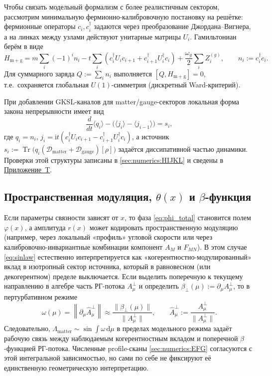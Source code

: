 \documentclass[11pt,a4paper]{article}
\DeclareMathOperator{\Tr}{Tr}
\newcommand{\ii}{\mathrm{i}}
\newcommand{\dd}{\mathrm{d}}
\theoremstyle{definition}
\theoremstyle{plain}
\theoremstyle{remark}
\begin{document}
Чтобы связать модельный формализм с более реалистичным сектором, рассмотрим минимальную фермионно-калибровочную
постановку на решётке: фермионные операторы $c_i,c_i^\dagger$ задаются через преобразование Джордана--Вигнера,
а на линках между узлами действуют унитарные матрицы $U_i$.
Гамильтониан берём в виде
\begin{equation}\label{eq:matter_hamiltonian}
H_{\mathrm{m+g}}
=
m\sum_i(-1)^i n_i
-t\sum_i\!\left(c_i^\dagger U_i c_{i+1}+c_{i+1}^\dagger U_i^\dagger c_i\right)
+\frac{\omega_g}{2}\sum_i Z_i^{(g)},
\qquad
n_i:=c_i^\dagger c_i.
\end{equation}
Для суммарного заряда $Q:=\sum_i n_i$ выполняется
$[Q,H_{\mathrm{m+g}}]=0$,
т.е.\ сохраняется глобальная $U(1)$-симметрия (дискретный Ward-критерий).

При добавлении GKSL-каналов для matter/gauge-секторов локальная форма закона непрерывности имеет вид
\begin{equation}\label{eq:matter_continuity}
\frac{d}{dt}\langle q_i\rangle
-\bigl(\langle j_i\rangle-\langle j_{i-1}\rangle\bigr)
=
s_i,
\end{equation}
где $q_i=n_i$,
$j_i=\ii t\!\left(c_i^\dagger U_i c_{i+1}-c_{i+1}^\dagger U_i^\dagger c_i\right)$,
а источник
$s_i:=\Tr\!\bigl(q_i(\mathcal D_{\mathrm{matter}}+\mathcal D_{\mathrm{gauge}})[\rho]\bigr)$
задаётся диссипативной частью динамики.
Проверки этой структуры записаны в \cref{sec:numerics:HIJKL} и сведены в \hyperref[sec:appendix:toy]{Приложение~T}.

\subsection[Пространственная модуляция, theta(x) и beta-функция]{Пространственная модуляция, $\theta(x)$ и $\beta$-функция}
\label{sec:theory:theta}

Если параметры связности зависят от $x$, то фаза \eqref{eq:phi_total} становится полем $\varphi(x)$, а амплитуда $r(x)$
может кодировать пространственную модуляцию (например, через локальный «профиль» угловой скорости или через калибровочно-инвариантные
комбинации компонент $A_M$ и $F_{MN}$).
В этом случае \eqref{eq:sinlaw} естественно интерпретируется как «когерентностно-модулированный» вклад в изотропный сектор источника,
который в равновесном (или декогерентном) пределе выключается.
Если выделить поперечную к текущему направлению в алгебре часть РГ-потока
$A_\mu^\perp$ и определить
$\beta_\perp(\mu):=\partial_\mu A_\mu^\perp$,
то в пертурбативном режиме
\[
\omega(\mu)=\left\|\partial_\mu\hat A_\mu^\perp\right\|
\approx
\frac{\|\beta_\perp(\mu)\|}{\|A_\mu^\perp\|},
\qquad
\hat A_\mu^\perp:=\frac{A_\mu^\perp}{\|A_\mu^\perp\|}.
\]
Следовательно,
$\Lambda_{\mathrm{matter}}\sim\sin\!\int\omega\,\dd\mu$
в пределах модельного режима задаёт рабочую связь между наблюдаемым когерентностным вкладом
и поперечной $\beta$-функцией РГ-потока.
Численные profile-сканы \cref{sec:numerics:EFG} согласуются с этой интегральной зависимостью,
но сами по себе не фиксируют её единственную геометрическую интерпретацию.
\end{document}
